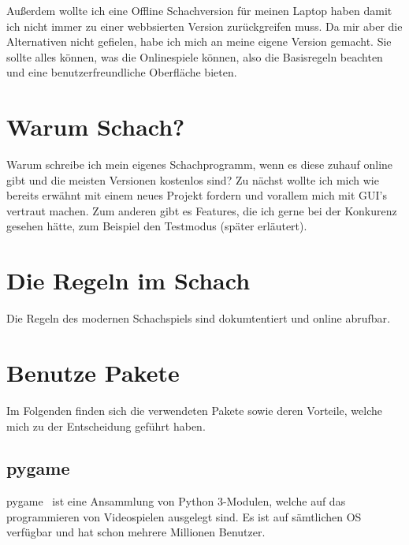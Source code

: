 \documentclass[a4paper, 10pt]{scrartcl}
\begin{document}
Außerdem wollte ich eine Offline Schachversion für meinen Laptop haben
damit ich nicht immer zu einer webbsierten Version zurückgreifen muss. Da mir aber die
Alternativen nicht gefielen, habe ich mich an meine eigene Version gemacht. Sie sollte
alles können, was die Onlinespiele können, also die Basisregeln beachten und eine benutzerfreundliche
Oberfläche bieten. 

\section{Warum Schach?}
Warum schreibe ich mein eigenes Schachprogramm, wenn es diese zuhauf online gibt und die meisten Versionen kostenlos sind?
Zu nächst wollte ich mich wie bereits erwähnt mit einem neues Projekt fordern und vorallem mich mit GUI's vertraut machen.
Zum anderen gibt es Features, die ich gerne bei der \glqq Konkurenz\grqq{} gesehen hätte, zum Beispiel den Testmodus (später erläutert).

\section{Die Regeln im Schach}
Die Regeln des modernen Schachspiels sind dokumtentiert und online abrufbar\cite{schachregeln}.

\section{Benutze Pakete}
Im Folgenden finden sich die verwendeten Pakete sowie deren Vorteile, welche mich zu der Entscheidung geführt haben.

\subsection{pygame}
\glqq pygame\grqq{}~\cite{pygame} ist eine Ansammlung von Python 3-Modulen, welche auf das programmieren von Videospielen ausgelegt sind. Es ist auf sämtlichen OS verfügbar und hat schon mehrere Millionen Benutzer.
\end{document}
